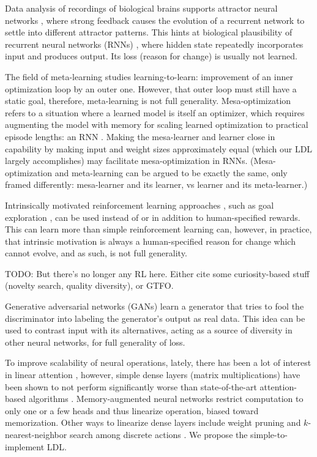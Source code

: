 \documentclass{article}
\begin{document}
Data analysis of recordings of biological brains supports attractor neural networks \cite{AMIT1990111}, where strong feedback causes the evolution of a recurrent network to settle into different attractor patterns. This hints at biological plausibility of recurrent neural networks (RNNs) \cite{1986Natur.323.533R}, where hidden state repeatedly incorporates input and produces output. Its loss (reason for change) is usually not learned.

The field of meta-learning studies learning-to-learn: improvement of an inner optimization loop by an outer one. However, that outer loop must still have a static goal, therefore, meta-learning is not full generality. Mesa-optimization \cite{hubinger2019risks} refers to a situation where a learned model is itself an optimizer, which requires augmenting the model with memory for scaling learned optimization to practical episode lengths: an RNN \cite{Ravi2017OptimizationAA}. Making the mesa-learner and learner close in capability by making input and weight sizes approximately equal (which our LDL largely accomplishes) may facilitate mesa-optimization in RNNs. (Mesa-optimization and meta-learning can be argued to be exactly the same, only framed differently: mesa-learner and its learner, vs learner and its meta-learner.)

Intrinsically motivated reinforcement learning approaches \cite{6294131}, such as goal exploration \cite{DBLP:journals/corr/abs-1708-02190}, can be used instead of or in addition to human-specified rewards. This can learn more than simple reinforcement learning can, however, in practice, that intrinsic motivation is always a human-specified reason for change which cannot evolve, and as such, is not full generality.

    TODO: But there's no longer any RL here. Either cite some curiosity-based stuff (novelty search, quality diversity), or GTFO.

Generative adversarial networks (GANs) \cite{goodfellow2014generative} learn a generator that tries to fool the discriminator into labeling the generator's output as real data. This idea can be used to contrast input with its alternatives, acting as a source of diversity in other neural networks, for full generality of loss.

To improve scalability of neural operations, lately, there has been a lot of interest in linear attention \cite{schlag2021linear}, however, simple dense layers (matrix multiplications) have been shown to not perform significantly worse than state-of-the-art attention-based algorithms \cite{tolstikhin2021mlpmixer}. Memory-augmented neural networks \cite{collier2019memoryaugmented} restrict computation to only one or a few heads and thus linearize operation, biased toward memorization. Other ways to linearize dense layers include weight pruning \cite{zhou2021effective} and $k$-nearest-neighbor search among discrete actions \cite{DBLP:journals/corr/Dulac-ArnoldESC15}. We propose the simple-to-implement LDL.
\end{document}

